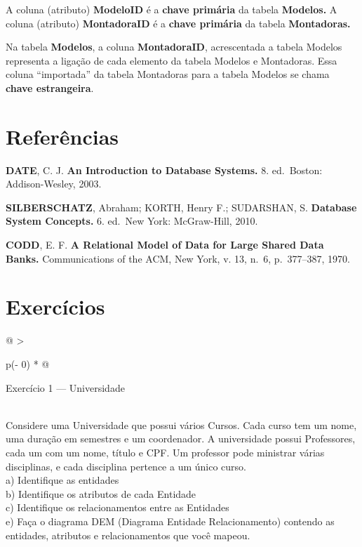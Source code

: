 \documentclass[
]{book}
\begin{document}
A coluna (atributo) \textbf{ModeloID} é a \textbf{chave primária} da tabela \textbf{Modelos.} A coluna (atributo) \textbf{MontadoraID} é a \textbf{chave primária} da tabela \textbf{Montadoras.}

Na tabela \textbf{Modelos}, a coluna \textbf{MontadoraID}, acrescentada a tabela Modelos representa a ligação de cada elemento da tabela Modelos e Montadoras. Essa coluna ``importada'' da tabela Montadoras para a tabela Modelos se chama \textbf{chave estrangeira}.

\section{Referências}\label{referuxeancias}

\textbf{DATE}, C. J. \textbf{An Introduction to Database Systems.} 8. ed.~Boston: Addison-Wesley, 2003.

\textbf{SILBERSCHATZ}, Abraham; KORTH, Henry F.; SUDARSHAN, S. \textbf{Database System Concepts.} 6. ed.~New York: McGraw-Hill, 2010.

\textbf{CODD}, E. F. \textbf{A Relational Model of Data for Large Shared Data Banks.} Communications of the ACM, New York, v. 13, n.~6, p.~377--387, 1970.

\section{Exercícios}\label{exercuxedcios-1}

\begin{longtable}[]{@{}
  >{\raggedright\arraybackslash}p{(\columnwidth - 0\tabcolsep) * }@{}}
\toprule\noalign{}
\begin{minipage}[b]{\linewidth}\raggedright
Exercício 1 --- Universidade
\end{minipage} \\
\midrule\noalign{}
\endhead
\bottomrule\noalign{}
\endlastfoot
Considere uma Universidade que possui vários Cursos. Cada curso tem um nome, uma duração em semestres e um coordenador. A universidade possui Professores, cada um com um nome, título e CPF. Um professor pode ministrar várias disciplinas, e cada disciplina pertence a um único curso. \\
a) Identifique as entidades \\
b) Identifique os atributos de cada Entidade \\
c) Identifique os relacionamentos entre as Entidades \\
e) Faça o diagrama DEM (Diagrama Entidade Relacionamento) contendo as entidades, atributos e relacionamentos que você mapeou. \\
\end{longtable}
\end{document}
